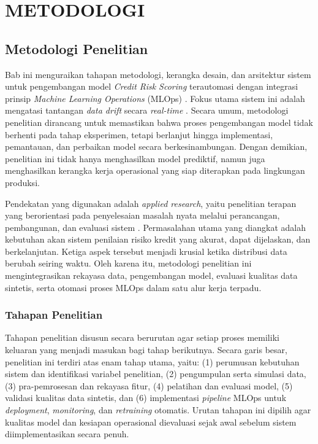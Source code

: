 \chapter{METODOLOGI}

\section{Metodologi Penelitian}

\noindent Bab ini menguraikan tahapan metodologi, kerangka desain, dan arsitektur sistem untuk pengembangan model \textit{Credit Risk Scoring} terautomasi dengan integrasi prinsip \textit{Machine Learning Operations} (MLOps) \cite{Kreuzberger2023, Nogare2023}. Fokus utama sistem ini adalah mengatasi tantangan \textit{data drift} secara \textit{real-time} \cite{mlopsdrift2025, datacamp2024drift}. Secara umum, metodologi penelitian dirancang untuk memastikan bahwa proses pengembangan model tidak berhenti pada tahap eksperimen, tetapi berlanjut hingga implementasi, pemantauan, dan perbaikan model secara berkesinambungan. Dengan demikian, penelitian ini tidak hanya menghasilkan model prediktif, namun juga menghasilkan kerangka kerja operasional yang siap diterapkan pada lingkungan produksi.

Pendekatan yang digunakan adalah \textit{applied research}, yaitu penelitian terapan yang berorientasi pada penyelesaian masalah nyata melalui perancangan, pembangunan, dan evaluasi sistem \cite{AIMSPress2024}. Permasalahan utama yang diangkat adalah kebutuhan akan sistem penilaian risiko kredit yang akurat, dapat dijelaskan, dan berkelanjutan. Ketiga aspek tersebut menjadi krusial ketika distribusi data berubah seiring waktu. Oleh karena itu, metodologi penelitian ini mengintegrasikan rekayasa data, pengembangan model, evaluasi kualitas data sintetis, serta otomasi proses MLOps dalam satu alur kerja terpadu.


\subsection{Tahapan Penelitian}
Tahapan penelitian disusun secara berurutan agar setiap proses memiliki keluaran yang menjadi masukan bagi tahap berikutnya. Secara garis besar, penelitian ini terdiri atas enam tahap utama, yaitu: (1) perumusan kebutuhan sistem dan identifikasi variabel penelitian, (2) pengumpulan serta simulasi data, (3) pra-pemrosesan dan rekayasa fitur, (4) pelatihan dan evaluasi model, (5) validasi kualitas data sintetis, dan (6) implementasi \textit{pipeline} MLOps untuk \textit{deployment}, \textit{monitoring}, dan \textit{retraining} otomatis. Urutan tahapan ini dipilih agar kualitas model dan kesiapan operasional dievaluasi sejak awal sebelum sistem diimplementasikan secara penuh.

